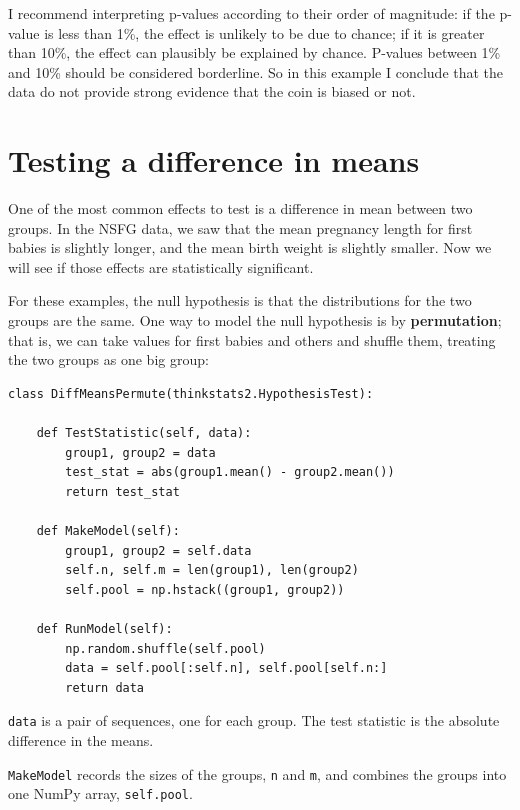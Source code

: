 \documentclass[12pt]{book}
\theoremstyle{exercise}
\begin{document}
I recommend interpreting p-values according to their order of
magnitude: if the p-value is less than 1\%, the effect is unlikely to
be due to chance; if it is greater than 10\%, the effect can plausibly
be explained by chance.  P-values between 1\% and 10\% should be
considered borderline.  So in this example I conclude that the
data do not provide strong evidence that the coin is biased or not.


\section{Testing a difference in means}%
\label{testdiff}%

One of the most common effects to test is a difference in mean
between two groups.  In the NSFG data, we saw that the mean pregnancy
length for first babies is slightly longer, and the mean birth weight
is slightly smaller.  Now we will see if those effects are
statistically significant.%
%
%
%

For these examples, the null hypothesis is that the distributions
for the two groups are the same.  One way to model the null
hypothesis is by {\bf permutation}; that is, we can take values
for first babies and others and shuffle them, treating
the two groups as one big group:%
%
%

\begin{verbatim}
class DiffMeansPermute(thinkstats2.HypothesisTest):

    def TestStatistic(self, data):
        group1, group2 = data
        test_stat = abs(group1.mean() - group2.mean())
        return test_stat

    def MakeModel(self):
        group1, group2 = self.data
        self.n, self.m = len(group1), len(group2)
        self.pool = np.hstack((group1, group2))

    def RunModel(self):
        np.random.shuffle(self.pool)
        data = self.pool[:self.n], self.pool[self.n:]
        return data
\end{verbatim}

{\tt data} is a pair of sequences, one for each
group.  The test statistic is the absolute difference in the means.%

{\tt MakeModel} records the sizes of the groups, {\tt n} and
{\tt m}, and combines the groups into one NumPy
array, {\tt self.pool}.%
\end{document}
